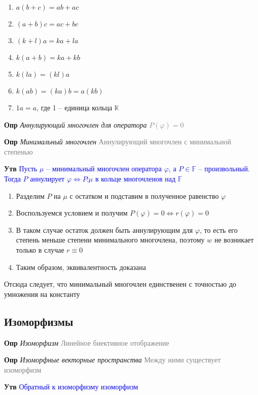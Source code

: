 \begin{enumerate}
    \item $a(b + c) = ab + ac$
    \item $(a + b)c = ac + bc$
    \item $(k+l)a = ka + la$
    \item $k(a + b) = ka + kb$
    \item $k(la) = (kl)a$
    \item $k(ab) = (ka)b = a(kb)$
    \item $1a = a$, где 1 -- единица кольца $\mathbb{K}$
\end{enumerate}

\textbf{Опр} \textit{Аннулирующий многочлен для оператора} \textcolor{gray}{$P(\varphi) = 0$}

\textbf{Опр} \textit{Минимальный многочлен} \textcolor{gray}{Аннулирующий многочлен с минимальной степенью}

\textbf{Утв} \textcolor{blue}{Пусть $\mu$ -- минимальный многочлен оператора $\varphi$, а $P \in \mathbb{F}$ --
произвольный.
Тогда $P$ аннулирует $\varphi \Leftrightarrow P \vdots \mu$ в кольце многочленов над $\mathbb{F}$}

\begin{enumerate}
    \item Разделим $P$ на $\mu$ с остатком и подставим в полученное равенство $\varphi$
    \item Воспользуемся условием и получим $P(\varphi) = 0 \Leftrightarrow r(\varphi) = 0$
    \item В таком случае остаток должен быть аннулирующим для $\varphi$, то есть его степень меньше степени
    минимального многочлена, поэтому $w$ не возникает только в случае $r \equiv 0$
    \item Таким образом, эквивалентность доказана
\end{enumerate}

Отсюда следует, что минимальный многочлен единственен с точностью до умножения на константу

\subsection{Изоморфизмы}

\textbf{Опр} \textit{Изоморфизм} \textcolor{gray}{Линейное биективное отображение}

\textbf{Опр} \textit{Изоморфные векторные пространства} \textcolor{gray}{Между ними существует изоморфизм}

\textbf{Утв} \textcolor{blue}{Обратный к изоморфизму изоморфизм}

